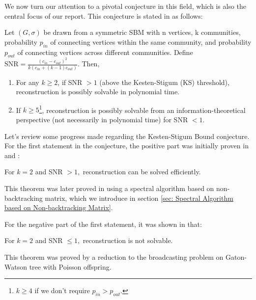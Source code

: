 We now turn our attention to a pivotal conjecture in this field, which is also the central focus of our report. This conjecture is stated in \cite{TheConjecture} as follows:
\begin{conjecture}\label{Conj}
    Let $(G, \sigma)$ be drawn from a symmetric SBM with n vertices, k communities, probability $p_{in}$ of connecting vertices within the same community, and probability $p_{out}$ of connecting vertices across different communities. Define $\text{SNR} = \frac{(c_{in}-c_{out})^2}{k(c_{in}+(k-1)c_{out})}.$ Then,
\begin{enumerate}
    \item For any \(k \geq 2\), if SNR \(> 1\) (above the Kesten-Stigum (KS) threshold), reconstruction is possibly solvable in polynomial time.
    \item If \(k \geq 5\)\footnote{$k\geq4$ if we don't require $p_{in}>p_{out}.$},  reconstruction is possibly solvable from an information-theoretical perspective (not necessarily in polynomial time) for SNR $<1$.
\end{enumerate}
\end{conjecture}
Let's review some progress made regarding the Kesten-Stigum Bound conjecture. For the first statement in the conjecture, the positive part was initially proven in \cite{mas14} and \cite{mns14b}:
\begin{theorem}\label{thm:1.1.1}
    For $k=2$ and SNR $>1,$ reconstruction can be solved efficiently.
\end{theorem}
\begin{remark}
    This theorem was later proved in \cite{blm15} using a spectral algorithm based on non-backtracking matrix, which we introduce in section \ref{sec: Spectral Algorithm based on Non-backtracking Matrix}.
\end{remark}
For the negative part of the first statement, it was shown in \cite{mns15} that:
\begin{theorem}\label{thm:1.1.2}
    For $k=2$ and SNR $\leq1,$ reconstruction is not solvable.
\end{theorem}
\begin{remark}
    This theorem was proved by a reduction to the broadcasting problem on Gaton-Watson tree with Poisson offspring.
\end{remark}

